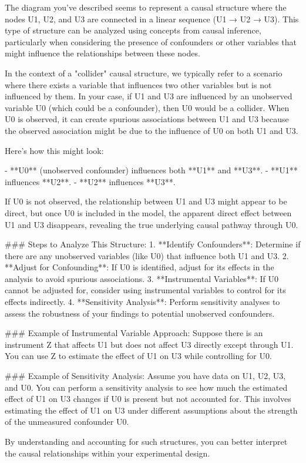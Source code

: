 The diagram you've described seems to represent a causal structure where the nodes U1, U2, and U3 are connected in a linear sequence (U1 → U2 → U3). This type of structure can be analyzed using concepts from causal inference, particularly when considering the presence of confounders or other variables that might influence the relationships between these nodes.

In the context of a "collider" causal structure, we typically refer to a scenario where there exists a variable that influences two other variables but is not influenced by them. In your case, if U1 and U3 are influenced by an unobserved variable U0 (which could be a confounder), then U0 would be a collider. When U0 is observed, it can create spurious associations between U1 and U3 because the observed association might be due to the influence of U0 on both U1 and U3.

Here's how this might look:

- **U0** (unobserved confounder) influences both **U1** and **U3**.
- **U1** influences **U2**.
- **U2** influences **U3**.

If U0 is not observed, the relationship between U1 and U3 might appear to be direct, but once U0 is included in the model, the apparent direct effect between U1 and U3 disappears, revealing the true underlying causal pathway through U0.

### Steps to Analyze This Structure:
1. **Identify Confounders**: Determine if there are any unobserved variables (like U0) that influence both U1 and U3.
2. **Adjust for Confounding**: If U0 is identified, adjust for its effects in the analysis to avoid spurious associations.
3. **Instrumental Variables**: If U0 cannot be adjusted for, consider using instrumental variables to control for its effects indirectly.
4. **Sensitivity Analysis**: Perform sensitivity analyses to assess the robustness of your findings to potential unobserved confounders.

### Example of Instrumental Variable Approach:
Suppose there is an instrument Z that affects U1 but does not affect U3 directly except through U1. You can use Z to estimate the effect of U1 on U3 while controlling for U0.

### Example of Sensitivity Analysis:
Assume you have data on U1, U2, U3, and U0. You can perform a sensitivity analysis to see how much the estimated effect of U1 on U3 changes if U0 is present but not accounted for. This involves estimating the effect of U1 on U3 under different assumptions about the strength of the unmeasured confounder U0.

By understanding and accounting for such structures, you can better interpret the causal relationships within your experimental design.